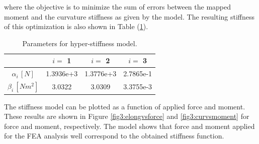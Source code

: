 where the objective is to minimize the sum of errors between the mapped moment and the curvature stiffness as given by the model. The resulting stiffness of this optimization is also shown in Table (\ref{tab3:stiffnessparameters}). 

\begin{table}[H]
    \centering
        \caption{Parameters for hyper-stiffness model.}
\begin{tabular}{|c|c|c|c|} \hline
            &  $i = $ 1      &    $i = $    2   &  $i = $ 3  \\ \hline
   $\alpha_i \hspace{2pt}[N]$    &    1.3936e+3    & 1.3776e+3    & 2.7865e-1 \\ \hline
   $\beta_i \hspace{2pt}  [Nm^2] $     &  3.0322 & 3.0309    &  3.3755e-3\\ \hline
\end{tabular}
    \label{tab3:stiffnessparameters}
\end{table}

The stiffness model can be plotted as a function of applied force and moment. These results are shown in Figure \ref{fig3:elongvsforce} and \ref{fig3:curvsmoment} for force and moment, respectively. The model shows that force and moment applied for the FEA analysis well correspond to the obtained stiffness function. 


